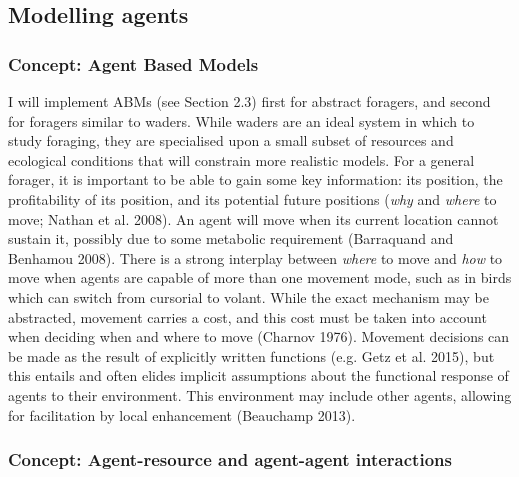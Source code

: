 \documentclass[]{scrartcl}
\begin{document}
\begin{linenumbers}
  \section{Modelling agents}\label{modelling-agents}

    \subsubsection{Concept: Agent Based
    Models}\label{concept-agent-based-models}

I will implement ABMs (see Section 2.3) first for abstract foragers, and
second for foragers similar to waders. While waders are an ideal system
in which to study foraging, they are specialised upon a small subset of
resources and ecological conditions that will constrain more realistic
models. For a general forager, it is important to be able to gain some
key information: its position, the profitability of its position, and
its potential future positions (\emph{why} and \emph{where} to move;
\protect\hypertarget{__UnoMark__4158_580056431}{}{}Nathan et al. 2008).
An agent will move when its current location cannot sustain it, possibly
due to some metabolic requirement
(\protect\hypertarget{__UnoMark__4165_580056431}{}{}Barraquand and
Benhamou 2008). There is a strong interplay between \emph{where} to move
and \emph{how} to move when agents are capable of more than one movement
mode, such as in birds which can switch from cursorial to volant. While
the exact mechanism may be abstracted, movement carries a cost, and this
cost must be taken into account when deciding when and where to move
(\protect\hypertarget{__UnoMark__4172_580056431}{}{}Charnov 1976).
Movement decisions can be made as the result of explicitly written
functions (e.g. \protect\hypertarget{__UnoMark__4179_580056431}{}{}Getz
et al. 2015), but this entails and often elides implicit assumptions
about the functional response of agents to their environment. This
environment may include other agents, allowing for facilitation by local
enhancement
(\protect\hypertarget{__UnoMark__4186_580056431}{}{}Beauchamp 2013).

\subsubsection{Concept: Agent-resource and agent-agent
interactions}\label{concept-agent-resource-and-agent-agent-interactions}


\end{linenumbers}
\end{document}
